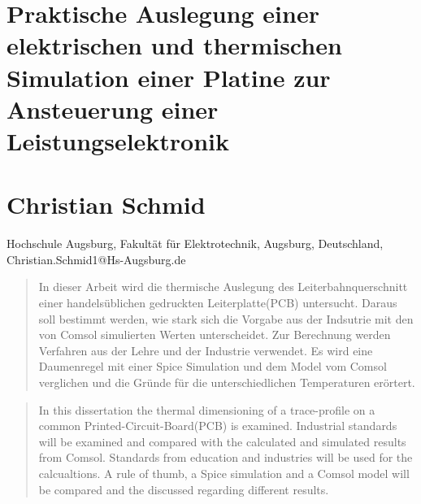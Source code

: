 \documentclass[10pt,a4paper,oneside,abstracton]{scrartcl}
\begin{document}
\section*{Praktische Auslegung einer elektrischen und thermischen Simulation einer Platine zur Ansteuerung einer Leistungselektronik}
\section*{Christian Schmid}
Hochschule Augsburg, Fakultät für Elektrotechnik, Augsburg, Deutschland, Christian.Schmid1@Hs-Augsburg.de 


\begin{abstract} %
\noindent %
In dieser Arbeit wird die thermische Auslegung des Leiterbahnquerschnitt einer handelsüblichen gedruckten Leiterplatte(PCB) untersucht. 
Daraus soll bestimmt werden, wie stark sich die Vorgabe aus der Indsutrie mit den von Comsol simulierten Werten unterscheidet. 
Zur Berechnung werden Verfahren aus der Lehre und der Industrie verwendet. 
Es wird eine Daumenregel mit einer Spice Simulation und dem Model vom Comsol verglichen und die Gründe für die 
unterschiedlichen Temperaturen erörtert. 
\end{abstract}

\renewcommand{\abstractname}{Abstract} %

\begin{abstract}
\noindent %
In this dissertation the thermal dimensioning  of a trace-profile on a  common Printed-Circuit-Board(PCB) is examined.
Industrial standards will be examined and compared with the calculated and simulated results from Comsol.
Standards from education and industries will be used for the calcualtions.  
A rule of thumb, a Spice simulation and a Comsol model will be compared and the discussed regarding different results. 
\end{abstract}
\end{document}
